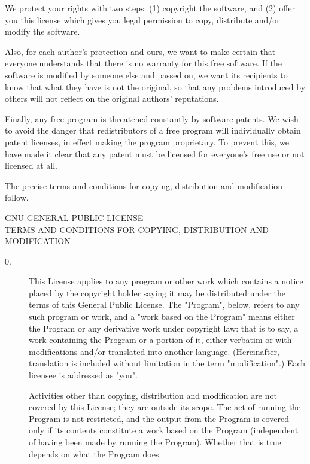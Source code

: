 {  We protect your rights with two steps: (1) copyright the software, and
(2) offer you this license which gives you legal permission to copy,
distribute and/or modify the software.

  Also, for each author's protection and ours, we want to make certain
that everyone understands that there is no warranty for this free
software.  If the software is modified by someone else and passed on, we
want its recipients to know that what they have is not the original, so
that any problems introduced by others will not reflect on the original
authors' reputations.

  Finally, any free program is threatened constantly by software
patents.  We wish to avoid the danger that redistributors of a free
program will individually obtain patent licenses, in effect making the
program proprietary.  To prevent this, we have made it clear that any
patent must be licensed for everyone's free use or not licensed at all.

  The precise terms and conditions for copying, distribution and
modification follow.

\begin{center}
		    GNU GENERAL PUBLIC LICENSE \\
   TERMS AND CONDITIONS FOR COPYING, DISTRIBUTION AND MODIFICATION \\
\end{center}

\begin{description}
\item[0.\hphantom{XX}] This License applies to any program or other work which contains
a notice placed by the copyright holder saying it may be distributed
under the terms of this General Public License.  The "Program", below,
refers to any such program or work, and a "work based on the Program"
means either the Program or any derivative work under copyright law:
that is to say, a work containing the Program or a portion of it,
either verbatim or with modifications and/or translated into another
language.  (Hereinafter, translation is included without limitation in
the term "modification".)  Each licensee is addressed as "you".

Activities other than copying, distribution and modification are not
covered by this License; they are outside its scope.  The act of
running the Program is not restricted, and the output from the Program
is covered only if its contents constitute a work based on the
Program (independent of having been made by running the Program).
Whether that is true depends on what the Program does.


\end{description}}
